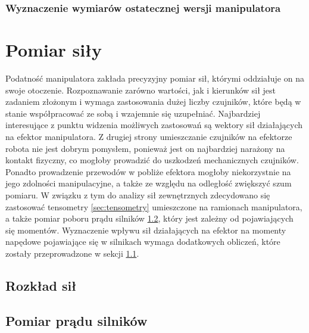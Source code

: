 \documentclass[printmode]{mgr}
\begin{document}
\subsection{Wyznaczenie wymiarów ostatecznej wersji manipulatora}


\chapter{Pomiar siły}
Podatność manipulatora zakłada precyzyjny pomiar sił, którymi oddziałuje on na swoje otoczenie. Rozpoznawanie
zarówno wartości, jak i kierunków sił jest zadaniem złożonym i wymaga zastosowania dużej liczby czujników, które
będą w stanie współpracować ze sobą i wzajemnie się uzupełniać. Najbardziej interesujące z punktu widzenia możliwych zastosowań
są wektory sił działających na efektor manipulatora. Z drugiej strony umieszczanie czujników na efektorze robota nie jest dobrym pomysłem,
ponieważ jest on najbardziej narażony na kontakt fizyczny, co mogłoby prowadzić do uszkodzeń mechanicznych czujników. Ponadto
prowadzenie przewodów w pobliże efektora mogłoby niekorzystnie na jego zdolności manipulacyjne, a także ze względu na odległość zwiększyć
szum pomiaru. W związku z tym do analizy sił zewnętrznych zdecydowano się zastosować tensometry \ref{sec:tensometry} umieszczone na 
ramionach manipulatora, 
a także pomiar poboru prądu silników \ref{sec:pomiar_pradu_silnikow}, który jest zależny od pojawiających się momentów. Wyznaczenie wpływu sił działających
na efektor na momenty napędowe pojawiające się w silnikach wymaga dodatkowych obliczeń, które zostały przeprowadzone w sekcji \ref{sec:rozklad_sil}.

\section{Rozkład sił}\label{sec:rozklad_sil}

\section{Pomiar prądu silników}\label{sec:pomiar_pradu_silnikow}
\end{document}
